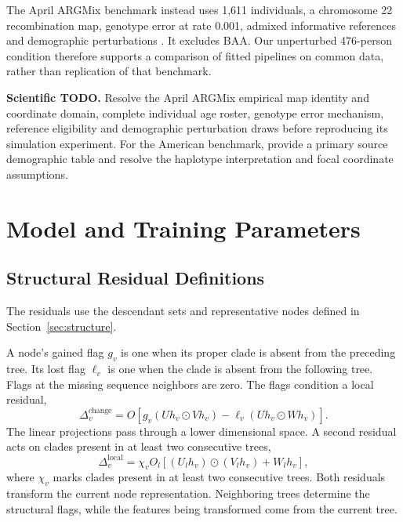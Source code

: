 \documentclass[letterpaper]{article}
\newcommand{\todo}[1]{\par\noindent\textbf{Scientific TODO.} #1\par}
\begin{document}
The April ARGMix benchmark instead uses 1,611 individuals, a chromosome 22 recombination map, genotype error at rate 0.001, admixed informative references and demographic perturbations \citep{ancientancestry2026}. It excludes BAA. Our unperturbed 476-person condition therefore supports a comparison of fitted pipelines on common data, rather than replication of that benchmark.

\todo{Resolve the April ARGMix empirical map identity and coordinate domain, complete individual age roster, genotype error mechanism, reference eligibility and demographic perturbation draws before reproducing its simulation experiment. For the American benchmark, provide a primary source demographic table and resolve the haplotype interpretation and focal coordinate assumptions.}

\section{Model and Training Parameters}
\label{app:training}

\subsection{Structural Residual Definitions}
The residuals use the descendant sets and representative nodes defined in Section~\ref{sec:structure}.

A node's gained flag $g_v$ is one when its proper clade is absent from the preceding tree. Its lost flag $\ell_v$ is one when the clade is absent from the following tree. Flags at the missing sequence neighbors are zero. The flags condition a local residual,
\begin{equation}
\Delta_v^{\mathrm{change}}=
O\!\left[
g_v(Uh_v\odot Vh_v)
-\ell_v(Uh_v\odot Wh_v)
\right].
\label{eq:change}
\end{equation}
The linear projections pass through a lower dimensional space. A second residual acts on clades present in at least two consecutive trees,
\begin{equation}
\Delta_v^{\mathrm{local}}=
\chi_v O_l\!\left[(U_lh_v)\odot(V_lh_v)+W_lh_v\right],
\label{eq:local}
\end{equation}
where $\chi_v$ marks clades present in at least two consecutive trees. Both residuals transform the current node representation. Neighboring trees determine the structural flags, while the features being transformed come from the current tree.
\end{document}
